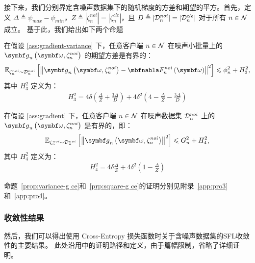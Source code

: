 接下来，我们分别界定含噪声数据集下的随机梯度的方差和期望的平方。首先，定义
 $\Delta \triangleq \psi_{max}-\psi_{min}$，$Z \triangleq |\zeta_n^{noi}| = |\zeta_n^{cle}|$，且 $D\triangleq |\mathcal{D}^{noi}_n|=|\mathcal{D}^{cle}_n|$ 对于所有 $n\in\mathcal{N}$ 成立。
基于此，我们给出如下两个命题
\begin{proposition}\label{prop:variance-g ce}
在假设 \ref{ass:gradient-variance} 下，任意客户端 $n\in\mathcal{N}$ 在噪声小批量上的 $\gb_n\left(\omegab,\zetanoi_n\right)$ 的期望方差是有界的：
\begin{equation}\label{bounded-variance with noise}
     \mathbb{E}_{\zetanoi_n\sim \Dnoi_n}\left[\left\Vert \gb_n\left(\boldsymbol{\omega},\zetanoi_n\right) - \nabla \fnoi_n\left(\boldsymbol{\omega}\right) \right\Vert^2 \right] \leq \phi_n^2+H_3^2,
\end{equation}
其中 $H_3^2$ 定义为：
\begin{align}\label{eq:H}
    H_3^2 =4\delta\left(\frac{\Delta}{Z}+\frac{3\Delta}{D}\right)+4\delta^2\left(4-\frac{\Delta}{Z}-\frac{3\Delta}{D}\right) 
\end{align}
\end{proposition}

\begin{proposition}\label{prp:square-g ce}
在假设 \ref{ass:gradient} 下，任意客户端 $n\in\mathcal{N}$ 在噪声数据集 $\mathcal{D}^{noi}_n$ 上的 $\gb_n\left(\omegab,\zetanoi_n\right)$ 是有界的，即：
\begin{equation}
    \mathbb{E}_{\zetanoi_n\sim \Dnoi_n}\left[\left\Vert \gb_n\left(\omegab, \zetanoi_n\right) \right\Vert^2\right] \leq G_n^2 + H_4^2,
\end{equation}
其中 $H_4^2$ 定义为：
\begin{align}\label{eq:H}
    H_4^2 = 4\delta\frac{\Delta}{Z}+4\delta^2\left(1-\frac{\Delta}{Z}\right)
\end{align}
\end{proposition}

命题~\ref{prop:variance-g ce}和~\ref{prp:square-g ce}的证明分别见附录~\ref{app:pro3}和~\ref{app:pro4}。

\subsubsection{收敛性结果}

然后，我们可以得出使用 Cross-Entropy 损失函数时关于含噪声数据集的SFL收敛性的主要结果。
此处沿用\label{proofC}中的证明路径和定义，由于篇幅限制，省略了详细证明。%

